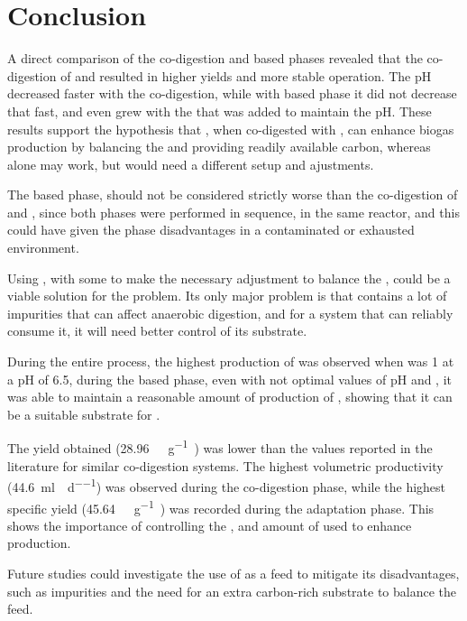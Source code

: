 \chapter{Conclusion}
\label{ch:conclusion}

A direct comparison of the co-digestion and  based phases revealed that the co-digestion of  and  resulted in higher  yields and more stable operation. The pH decreased faster with the co-digestion, while with  based phase it did not decrease that fast, and even grew with the  that was added to maintain the pH. These results support the hypothesis that , when co-digested with , can enhance biogas production by balancing the  and providing readily available carbon, whereas  alone may work, but would need a different setup and ajustments.

The  based phase, should not be considered strictly worse than the co-digestion of  and , since both phases were performed in sequence, in the same reactor, and this could have given the  phase disadvantages in a contaminated or exhausted environment.

Using , with some  to make the necessary adjustment to balance the , could be a viable solution for the  problem. Its only major problem is that  contains a lot of impurities that can affect anaerobic digestion, and for a system that can reliably consume it, it will need better control of its substrate.

During the entire process, the highest production of  was observed when  was \approx\num{1} at a pH of \approx\num{6.5}, during the  based phase, even with not optimal values of pH and , it was able to maintain a reasonable amount of production of , showing that it can be a suitable substrate for .

The  yield obtained (\qty{28.96}{\nml\CH\per\gram\VSfed}) was lower than the values reported in the literature for similar co-digestion systems. The highest volumetric productivity (\qty{44.6}{\milli\litre\per\reactorlitre\per\day}) was observed during the co-digestion phase, while the highest specific yield (\qty{45.64}{\nml\CH\per\gram\VSfed}) was recorded during the adaptation phase. This shows the importance of controlling the ,  and amount of  used to enhance  production.

Future studies could investigate the use of  as a feed to mitigate its disadvantages, such as impurities and the need for an extra carbon-rich substrate to balance the feed.
